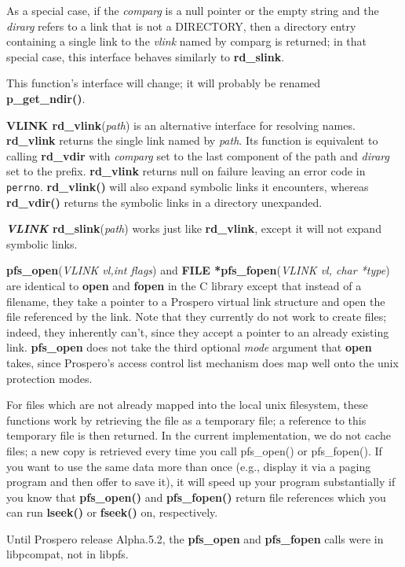 As a special case, if the {\it comparg} is a null pointer or the empty
string and the {\it dirarg} refers to a link that is not a  DIRECTORY,
then a directory entry containing a single link to the {\it vlink}
named by comparg is returned; in that special case, this interface
behaves similarly to {\bf rd\_slink}.

This function's interface will change; it will probably be
renamed {\bf p\_get\_ndir()}.

{\bf VLINK rd\_vlink}({\it path}) is an alternative interface for
resolving names.  {\bf rd\_vlink} returns the single link named by
{\it path}.  Its function is equivalent to calling {\bf rd\_vdir} with
{\it comparg} set to the last component of the path and {\it dirarg}
set to the prefix.  {\bf rd\_vlink} returns {\sc null} on failure
leaving an error code in {\tt perrno}.  {\bf rd\_vlink()} will also
expand symbolic links it encounters, whereas {\bf rd\_vdir()} returns
the symbolic links in a directory unexpanded.  

{\bf {\it VLINK} rd\_slink}({\it path}) works just like {\bf
rd\_vlink}, except it will not expand symbolic links.


{\bf pfs\_open}({\it VLINK vl,int flags}) and
{\bf FILE *pfs\_fopen}({\it VLINK vl, char *type}) are identical to {\bf open} and {\bf fopen} in
the C library except that instead of a filename, they take a pointer
to a Prospero 
virtual link structure and open the file referenced by the link.
Note that they currently do not work to create files; indeed, they
inherently can't, since they accept a pointer to an already existing
link.   {\bf pfs\_open} does not take the third optional {\it mode}
argument that {\bf open} takes, since Prospero's access control list
mechanism does map well onto the {\sc unix} protection modes.

For files which are not already mapped into the local {\sc unix}
filesystem, these functions work by retrieving the file as a temporary
file; a reference to this temporary file is then returned.  In the
current implementation, we do not cache files; a new copy is retrieved
every time you call pfs\_open() or pfs\_fopen().  If you want to use
the same data more than once (e.g., display it via a paging program
and then offer to save it), it will speed up your program
substantially if you know that {\bf pfs\_open()} and {\bf
pfs\_fopen()} return file references which you can run {\bf lseek()}
or {\bf fseek()} on, respectively.

Until Prospero release Alpha.5.2, the {\bf pfs\_open} and {\bf
pfs\_fopen} calls were in libpcompat, not in libpfs.

